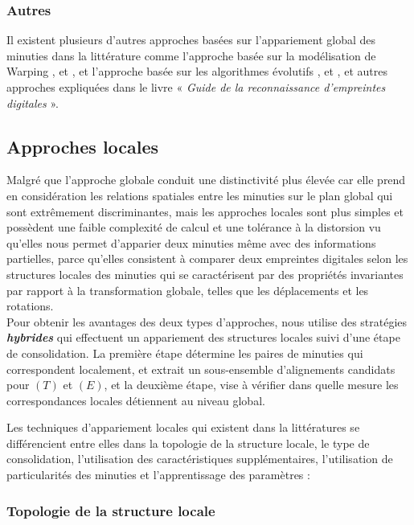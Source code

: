 \subsubsection{Autres}
Il existent plusieurs d'autres approches basées sur l'appariement global des minuties dans la littérature comme l'approche basée sur la modélisation de Warping \citep{meenen2006utilization}, \citep{liang2006fingerprint} et \citep{shi2009minucode} , et l'approche basée sur les algorithmes évolutifs \citep{sheng2009consensus}, \citep{sheng2007memetic} et \citep{tan2006fingerprint}, et autres approches expliquées dans le livre « \textit{Guide de la reconnaissance d'empreintes digitales} \citep{maltoni2009handbook}».
\subsection{Approches locales }
Malgré que l'approche globale conduit une distinctivité plus élevée car elle prend en considération  les relations spatiales entre les minuties sur le plan global qui sont extrêmement discriminantes, mais les approches locales sont plus simples et possèdent une faible complexité de calcul et une tolérance à la distorsion vu qu'elles nous permet d'apparier deux minuties même avec des informations partielles, parce qu'elles consistent à comparer deux empreintes digitales selon les structures locales des minuties qui se caractérisent par des propriétés invariantes par rapport à la transformation globale, telles que les déplacements et les rotations.
\\ Pour obtenir les avantages des deux types d'approches, nous utilise des stratégies \textit{\textbf{hybrides}} qui effectuent un appariement des structures locales suivi d'une étape de consolidation. La première étape détermine les paires de minuties qui correspondent localement, et extrait un sous-ensemble d'alignements candidats pour $ (T) $ et $ (E) $, et la deuxième étape, vise à vérifier dans quelle mesure les correspondances locales détiennent au niveau global. 

Les techniques d'appariement locales qui existent dans la littératures se différencient entre elles dans la topologie de la structure locale, le type de consolidation, l'utilisation des caractéristiques supplémentaires, l'utilisation de particularités des minuties et l'apprentissage des paramètres \citep{Peralta2015a} :
\subsubsection{Topologie de la structure locale  }

